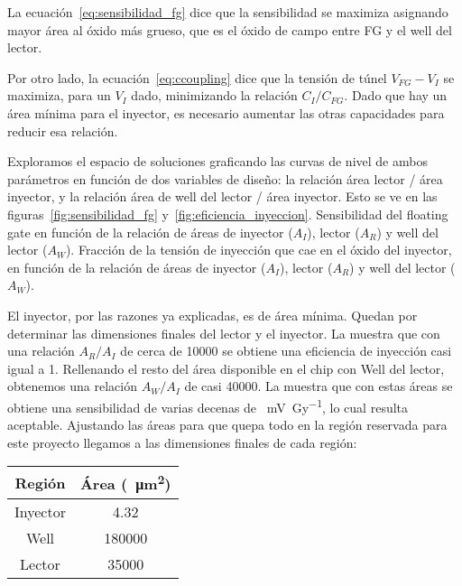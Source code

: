 La ecuación~\ref{eq:sensibilidad_fg} dice que la sensibilidad se maximiza
asignando mayor área al óxido más grueso,
que es el óxido de campo entre FG y el well del lector.

Por otro lado,
la ecuación~\ref{eq:ccoupling} dice que la tensión de túnel $V_{FG}-V_I$
se maximiza, para un $V_I$ dado,
minimizando la relación $C_I/C_{FG}$.
Dado que hay un área mínima para el inyector,
es necesario aumentar las otras capacidades para reducir esa relación.

Exploramos el espacio de soluciones
graficando las curvas de nivel de ambos parámetros en función de dos variables
de diseño:
la relación área lector / área inyector,
y la relación área de well del lector / área inyector.
Esto se ve en las figuras~\ref{fig:sensibilidad_fg}
y~\ref{fig:eficiencia_inyeccion}.
{Sensibilidad del floating gate en función de la relación de áreas de 
inyector ($A_I$),
lector ($A_R$) 
y well del lector ($A_W$).}
{Fracción de la tensión de inyección que cae en el óxido del inyector,
en función de la relación de áreas de 
inyector ($A_I$),
lector ($A_R$) 
y well del lector ($A_W$).}

El inyector, por las razones ya explicadas, es de área mínima.
Quedan por determinar las dimensiones finales del lector y el inyector.
La 
muestra que con una relación $A_R/A_I$ de cerca de 10000
se obtiene una eficiencia de inyección casi igual a 1.
Rellenando el resto del área disponible en el chip con Well del lector,
obtenemos una relación $A_W/A_I$ de casi 40000.
La  muestra que con estas áreas
se obtiene una sensibilidad de varias decenas de \SI{}{\milli\volt\per\gray},
lo cual resulta aceptable.
Ajustando las áreas para que quepa todo 
en la región reservada para este proyecto 
llegamos a las dimensiones finales de cada región:
\begin{table}[h]
\centering
\begin{tabular}{|c|c|}
    \hline
    Región   & Área (\SI{}{\micro\meter\squared})\\ \hline
    Inyector \vspace{0.5cm}& 4.32\\
Well     & 180000\\
Lector   & 35000\\
\hline
\end{tabular}
\end{table}
%
